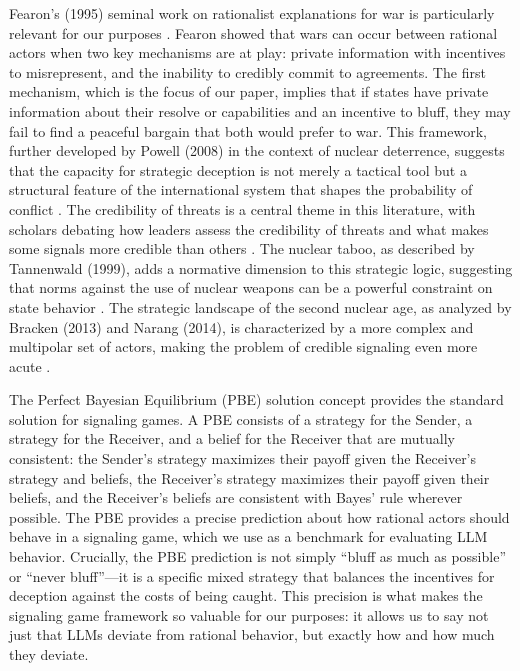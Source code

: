 \documentclass[12pt]{article}
\theoremstyle{plain}
\theoremstyle{definition}
\begin{document}
Fearon's (1995) seminal work on rationalist explanations for war is particularly relevant for our purposes \citep{Fearon1995}. Fearon showed that wars can occur between rational actors when two key mechanisms are at play: private information with incentives to misrepresent, and the inability to credibly commit to agreements. The first mechanism, which is the focus of our paper, implies that if states have private information about their resolve or capabilities and an incentive to bluff, they may fail to find a peaceful bargain that both would prefer to war. This framework, further developed by Powell (2008) in the context of nuclear deterrence, suggests that the capacity for strategic deception is not merely a tactical tool but a structural feature of the international system that shapes the probability of conflict \citep{Powell2008, SechserFuhrmann2017}. The credibility of threats is a central theme in this literature, with scholars debating how leaders assess the credibility of threats and what makes some signals more credible than others \citep{Press2005, Sartori2005}. The nuclear taboo, as described by Tannenwald (1999), adds a normative dimension to this strategic logic, suggesting that norms against the use of nuclear weapons can be a powerful constraint on state behavior \citep{Tannenwald1999}. The strategic landscape of the second nuclear age, as analyzed by Bracken (2013) and Narang (2014), is characterized by a more complex and multipolar set of actors, making the problem of credible signaling even more acute \citep{Bracken2013, Narang2014}.

The Perfect Bayesian Equilibrium (PBE) solution concept provides the standard solution for signaling games. A PBE consists of a strategy for the Sender, a strategy for the Receiver, and a belief for the Receiver that are mutually consistent: the Sender's strategy maximizes their payoff given the Receiver's strategy and beliefs, the Receiver's strategy maximizes their payoff given their beliefs, and the Receiver's beliefs are consistent with Bayes' rule wherever possible. The PBE provides a precise prediction about how rational actors should behave in a signaling game, which we use as a benchmark for evaluating LLM behavior. Crucially, the PBE prediction is not simply ``bluff as much as possible'' or ``never bluff''---it is a specific mixed strategy that balances the incentives for deception against the costs of being caught. This precision is what makes the signaling game framework so valuable for our purposes: it allows us to say not just that LLMs deviate from rational behavior, but exactly how and how much they deviate.
\end{document}
